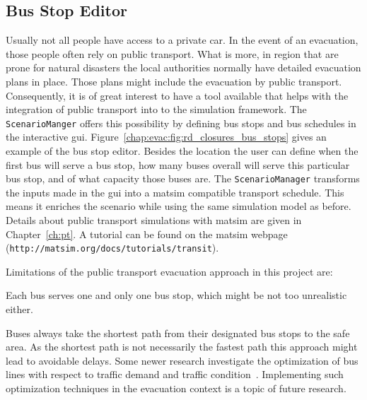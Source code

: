 \subsection{Bus Stop Editor}
Usually not all people have access to a private car. In the event of an evacuation, those people often rely on public transport. What is more, in region that are prone for natural disasters the local authorities normally have detailed evacuation plans in place. Those plans might include the evacuation by public transport. Consequently, it is of great interest to have a tool available that helps with the integration of public transport into to the simulation framework. The \lstinline|ScenarioManger| offers this possibility by defining bus stops and bus schedules in the interactive \gls{gui}. Figure~\ref{chap:evac:fig:rd_closures_bus_stops} gives an example of the bus stop editor. Besides the location the user can define when the first bus will serve a bus stop, how many buses overall will serve this particular bus stop, and of what capacity those buses are. 
The \lstinline|ScenarioManager| transforms the inputs made in the \gls{gui} into a \gls{matsim} compatible transport schedule. This means it enriches the scenario while using the same simulation model as before. Details about public transport simulations with \gls{matsim} are given in Chapter~\ref{ch:pt}. A tutorial can be found on the \gls{matsim} webpage (\lstinline|http://matsim.org/docs/tutorials/transit|).

Limitations of the public transport evacuation approach in this project are:
\begin{compactitem}
\item Each bus serves one and only one bus stop, which might be not too unrealistic either.
\item Buses always take the shortest path from their designated bus stops to the safe area. As the shortest path is not necessarily the fastest path this approach might lead to avoidable delays. Some newer research investigate the optimization of bus lines with respect to traffic demand and traffic condition~\citep{Neumann_PhDThesis_2014}. Implementing such optimization techniques in the evacuation context is a topic of future research.
\end{compactitem}


